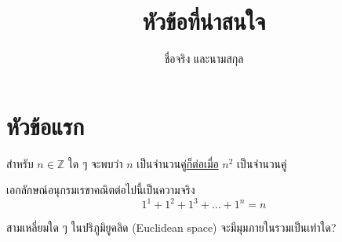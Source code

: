\documentclass[12pt,a4paper]{article}
\title{หัวข้อที่น่าสนใจ}
\author{ชื่อจริง และนามสกุล}
\date{}
\begin{document}
\maketitle
\thispagestyle{titlepage}

\section*{หัวข้อแรก}

\begin{theorem}
    สำหรับ $n \in \mathbb{Z}$ ใด ๆ จะพบว่า $n$ เป็นจำนวนคู่\hrsp{}\uline{ก็ต่อเมื่อ} $n^2$ เป็นจำนวนคู่ 
\end{theorem}

{\elseries\lipsum[1]}

{\ltseries\lipsum[2]}

{\mdseries\lipsum[3]}

{\mbseries\lipsum[4]}

{\sbseries\lipsum[5]}

{\bfseries\lipsum[6]}

{\ebseries\lipsum[7]}

\begin{theorem}
    เอกลักษณ์อนุกรมเรขาคณิตต่อไปนี้เป็นความจริง
    \[
        1^1 + 1^2 + 1^3 + \ldots + 1^n = n \tag*{\qedhere}    
    \]
\end{theorem}
\begin{question}
    สามเหลี่ยมใด ๆ ในปริภูมิยูคลิด (Euclidean space) จะมีมุมภายในรวมเป็นเท่าใด?
\end{question}
\end{document}
